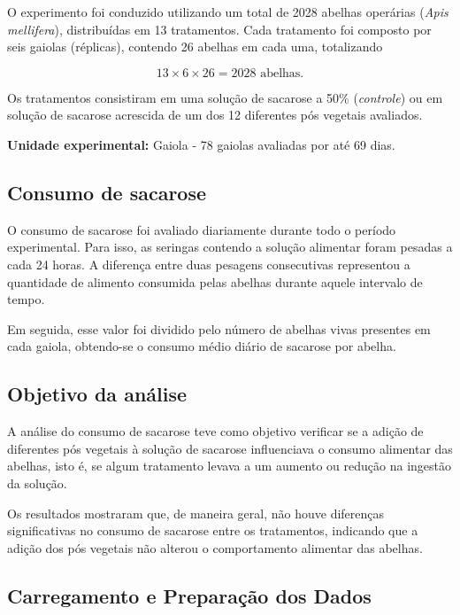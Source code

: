 \documentclass[
  brazilian,
  12pt,
  a4paper,
]{article}
\begin{document}
O experimento foi conduzido utilizando um total de 2028 abelhas
operárias (\textit{Apis mellifera}), distribuídas em 13 tratamentos.
Cada tratamento foi composto por seis gaiolas (réplicas), contendo 26
abelhas em cada uma, totalizando

\[
13 \times 6 \times 26 = 2028 \text{ abelhas}.
\]

Os tratamentos consistiram em uma solução de sacarose a 50\%
(\textit{controle}) ou em solução de sacarose acrescida de um dos 12
diferentes pós vegetais avaliados.

\textbf{Unidade experimental:} Gaiola - 78 gaiolas avaliadas por até 69
dias.

\subsection{Consumo de sacarose}

O consumo de sacarose foi avaliado diariamente durante todo o período
experimental. Para isso, as seringas contendo a solução alimentar foram
pesadas a cada 24 horas. A diferença entre duas pesagens consecutivas
representou a quantidade de alimento consumida pelas abelhas durante
aquele intervalo de tempo.

Em seguida, esse valor foi dividido pelo número de abelhas vivas
presentes em cada gaiola, obtendo-se o consumo médio diário de sacarose
por abelha.

\subsection{Objetivo da análise}

A análise do consumo de sacarose teve como objetivo verificar se a
adição de diferentes pós vegetais à solução de sacarose influenciava o
consumo alimentar das abelhas, isto é, se algum tratamento levava a um
aumento ou redução na ingestão da solução.

Os resultados mostraram que, de maneira geral, não houve diferenças
significativas no consumo de sacarose entre os tratamentos, indicando
que a adição dos pós vegetais não alterou o comportamento alimentar das
abelhas.

\subsection{Carregamento e Preparação dos
Dados}\label{carregamento-e-preparauxe7uxe3o-dos-dados}
\end{document}
